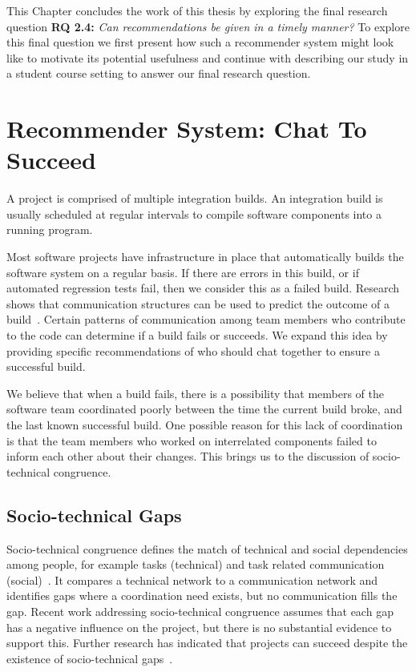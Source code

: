 \label{chap:actionable}
This Chapter concludes the work of this thesis by exploring the final research question \textbf{RQ 2.4:} \emph{Can recommendations be given in a timely manner?}
To explore this final question we first present how such a recommender system might look like to motivate its potential usefulness and continue with describing our study in a student course setting to answer our final research question.

\section{Recommender System: Chat To Succeed}

A project is comprised of multiple integration builds. An 
integration build is usually scheduled at regular intervals to 
compile software components into a running program. 

Most software projects have infrastructure in place that automatically builds the software system on a regular basis. If there are errors in this build, or if automated regression tests fail, then we consider this as a failed build.  Research shows that communication structures can be used 
to predict the outcome of a build~\cite{wolf:tr2008}.  Certain patterns of 
communication among team members who contribute to the 
code can determine if a build fails or succeeds. We expand this idea by providing specific recommendations of 
who should chat together to ensure a successful build.

We believe that when a build fails, there is a possibility that members of the software team coordinated poorly between the time the current build broke, and the last known successful build. One possible reason for this lack of coordination is that the team members who worked on interrelated components failed to inform each other about their changes. This brings us to the discussion of socio-technical congruence.


\subsection{Socio-technical Gaps}


Socio-technical congruence defines the match of technical 
and social dependencies among people, for example tasks 
(technical) and task related communication (social)~\cite{cataldo:cscw:2006}. It 
compares a technical network to a communication network 
and identifies gaps where a coordination need exists, but no 
communication fills the gap. Recent work addressing socio-technical congruence assumes that each gap has a negative 
influence on the project, but there is no substantial evidence 
to support this. Further research has indicated that projects 
can succeed despite the existence of socio-technical gaps~\cite{marczak:re:2008}.

